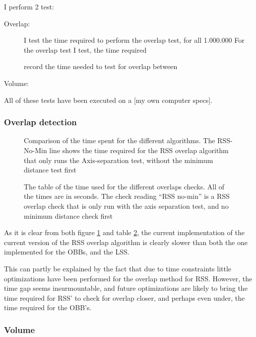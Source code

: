 I perform 2 test: 
\begin{description}
\item[Overlap:] I test the time required to perform the overlap test,
  for all 1.000.000  For the overlap test I test, the time required 

 record the time needed to test
  for overlap between  
\item[Volume:]
\end{description}

All of these tests have been executed on a [my own computer specs].

\subsubsection{Overlap detection}

\begin{figure}
\caption{\label{overlap-OBB_RSS_RSS-No-Min_LSS}Comparison of the time spent for the different algorithms. The RSS-No-Min line shows the time required for the RSS overlap algorithm that only runs the Axis-separation test, without the minimum distance test first}
\end{figure}

\begin{figure}[b]

\caption{\label{overlap-table}The table of the time used for the
  different overlaps checks. All of the times are in seconds. The
  check reading ``RSS no-min'' is a RSS overlap check that is only run
with the axis separation test, and no minimum distance check first}
\end{figure}

As it is clear from both figure \ref{overlap-OBB_RSS_RSS-No-Min_LSS} and table \ref{overlap-table}, the current implementation of the current version of the RSS overlap algorithm is clearly slower than both the one implemented for the OBBs, and the LSS. 

This can partly be explained by the fact that due to time constraints
little optimizations have been performed for the overlap method for
RSS. However, the time gap seems  insurmountable, and future optimizations are likely to bring the time required for RSS' to check for overlap closer, and perhaps even under, the time required for the OBB's.

\subsubsection{Volume}

